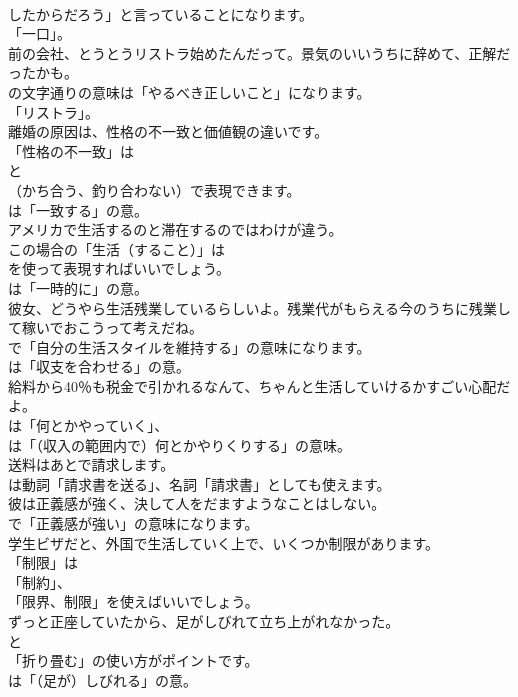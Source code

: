 \documentclass[8pt]{extreport}
\begin{document}
\begin{CJK}{UTF8}{min}
\\	したからだろう」と言っていることになります。
\\	「一口」。	
\\	前の会社、とうとうリストラ始めたんだって。景気のいいうちに辞めて、正解だったかも。 
\\	の文字通りの意味は「やるべき正しいこと」になります。
\\	「リストラ」。	
\\	離婚の原因は、性格の不一致と価値観の違いです。 
\\	「性格の不一致」は 
\\	と 
\\	（かち合う、釣り合わない）で表現できます。
\\	は「一致する」の意。	
\\	アメリカで生活するのと滞在するのではわけが違う。 
\\	この場合の「生活（すること）」は 
\\	を使って表現すればいいでしょう。
\\	は「一時的に」の意。	
\\	彼女、どうやら生活残業しているらしいよ。残業代がもらえる今のうちに残業して稼いでおこうって考えだね。 
\\	で「自分の生活スタイルを維持する」の意味になります。
\\	は「収支を合わせる」の意。	
\\	給料から40％も税金で引かれるなんて、ちゃんと生活していけるかすごい心配だよ。 
\\	は「何とかやっていく」、
\\	は「（収入の範囲内で）何とかやりくりする」の意味。	
\\	送料はあとで請求します。 
\\	は動詞「請求書を送る」、名詞「請求書」としても使えます。	
\\	彼は正義感が強く、決して人をだますようなことはしない。 
\\	で「正義感が強い」の意味になります。	
\\	学生ビザだと、外国で生活していく上で、いくつか制限があります。 
\\	「制限」は
\\	「制約」、
\\	「限界、制限」を使えばいいでしょう。	
\\	ずっと正座していたから、足がしびれて立ち上がれなかった。 
\\	と
\\	「折り畳む」の使い方がポイントです。
\\	は「（足が）しびれる」の意。	

\end{CJK}
\end{document}
